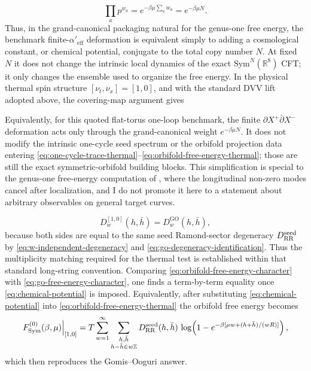 \documentclass[11pt]{article}
\newcommand{\Aeff}{\alpha'_{\mathrm{eff}}}
\newcommand{\Sym}{\mathrm{Sym}}
\newcommand{\bR}{\mathbb{R}}
\begin{document}
\begin{equation}\label{eq:cosmological-constant-weight}
\prod_a p^{w_a}
=
e^{-\beta\mu \sum_a w_a}
=
e^{-\beta\mu N}.
\end{equation}
Thus, in the grand-canonical packaging natural for the genus-one free energy, the benchmark finite-$\Aeff$ deformation is equivalent simply to adding a cosmological constant, or chemical potential, conjugate to the total copy number $N$. At fixed $N$ it does not change the intrinsic local dynamics of the exact $\Sym^N(\bR^8)$ CFT; it only changes the ensemble used to organize the free energy. In the physical thermal spin structure $[\nu_t,\nu_x]=[1,0]$, and with the standard DVV lift adopted above, the covering-map argument gives
\par
Equivalently, for this quoted flat-torus one-loop benchmark, the finite $\partial X^+\bar\partial X^-$ deformation acts only through the grand-canonical weight $e^{-\beta\mu N}$. It does not modify the intrinsic one-cycle seed spectrum or the orbifold projection data entering \eqref{eq:one-cycle-trace-thermal}--\eqref{eq:orbifold-free-energy-thermal}; those are still the exact symmetric-orbifold building blocks. This simplification is special to the genus-one free-energy computation of \cite{gomis2000nonrelativisticclosedstringtheory}, where the longitudinal non-zero modes cancel after localization, and I do not promote it here to a statement about arbitrary observables on general target curves.
\par
\begin{equation}\label{eq:degeneracy-match}
D_w^{[1,0]}(h,\bar h)=D^{\mathrm{GO}}_w(h,\bar h),
\end{equation}
because both sides are equal to the same seed Ramond-sector degeneracy $D_{\rm RR}^{\mathrm{seed}}$ by \eqref{eq:w-independent-degeneracy} and \eqref{eq:go-degeneracy-identification}. Thus the multiplicity matching required for the thermal test is established within that standard long-string convention. Comparing \eqref{eq:orbifold-free-energy-character} with \eqref{eq:go-free-energy-character}, one finds a term-by-term equality once \eqref{eq:chemical-potential} is imposed. Equivalently, after substituting \eqref{eq:chemical-potential} into \eqref{eq:orbifold-free-energy-thermal} the orbifold free energy becomes
\begin{equation}\label{eq:free-energy-match}
F^{(0)}_{\Sym}(\beta,\mu)\Big|_{[1,0]}
=
T\sum_{w=1}^\infty
\sum_{\substack{h,\bar h\\ h-\bar h\in w\mathbb Z}}
D_{\rm RR}^{\mathrm{seed}}(h,\bar h)\,
\log\!\left(
1-e^{-\beta[\mu w +(h+\bar h)/(wR)]}
\right),
\end{equation}
which then reproduces the Gomis--Ooguri answer.
\end{document}
